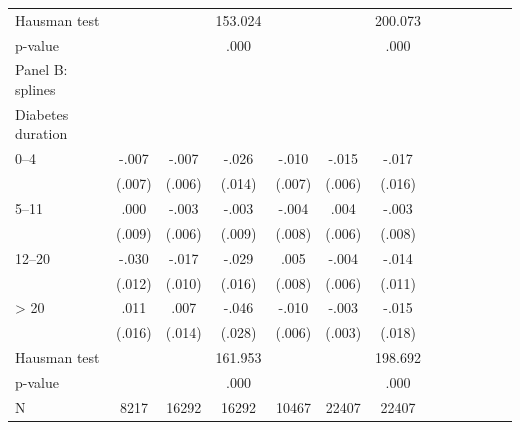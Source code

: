 \begin{table}[p]
\begin{center}
\begin{adjustbox}{max width=\linewidth}
\begin{threeparttable}
{\begin{tabular}{l*{6}{S
S}}
\midrule
                Hausman test    &                  &                  &  153.024         &                  &                  &  200.073         \\
                \hspace*{10mm} p-value         &                  &                  &     .000         &                  &                  &     .000         \\
\midrule
\addlinespace
Panel B: splines&&&&&&\\
Diabetes duration &&&&&&\\
\hspace*{10mm}0--4&    -.007         &    -.007         &    -.026\sym{*}  &    -.010         &    -.015\sym{**} &    -.017         \\
                &   (.007)         &   (.006)         &   (.014)         &   (.007)         &   (.006)         &   (.016)         \\
\hspace*{10mm}5--11&     .000         &    -.003         &    -.003         &    -.004         &     .004         &    -.003         \\
                &   (.009)         &   (.006)         &   (.009)         &   (.008)         &   (.006)         &   (.008)         \\
\hspace*{10mm}12--20&  -.030\sym{**} &    -.017\sym{*}  &    -.029\sym{*}  &     .005         &    -.004         &    -.014         \\
                &   (.012)         &   (.010)         &   (.016)         &   (.008)         &   (.006)         &   (.011)         \\
\hspace*{10mm}> 20&     .011         &     .007         &    -.046\sym{*}  &    -.010\sym{*}  &    -.003         &    -.015         \\
                &   (.016)         &   (.014)         &   (.028)         &   (.006)         &   (.003)         &   (.018)         \\
\midrule
Hausman test    &                  &                  &  161.953         &                  &                  &  198.692         \\
\hspace*{10mm} p-value         &                  &                  &     .000         &                  &                  &     .000         \\
N               &     8217         &    16292         &    16292         &    10467         &    22407         &    22407         \\

\end{tabular}}
\end{threeparttable}
\end{adjustbox}
\end{center}
\end{table}
